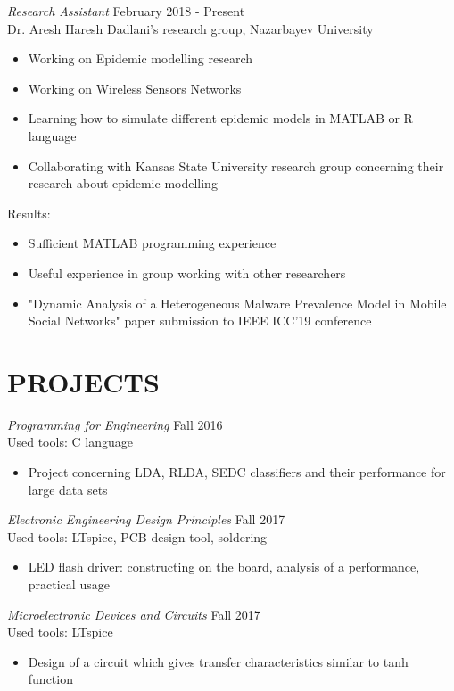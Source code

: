\documentclass[margin, 10pt]{res} %
\begin{document}
\begin{resume}
{\sl Research Assistant} \hfill February 2018 - Present \\
Dr. Aresh Haresh Dadlani's research group, Nazarbayev University
\begin{itemize}
\item Working on Epidemic modelling research
\item Working on Wireless Sensors Networks
\item Learning how to simulate different epidemic models in MATLAB or R language
\item Collaborating with Kansas State University research group concerning their research about epidemic modelling
\end{itemize} 
Results: 
\begin{itemize}
\item Sufficient MATLAB programming experience
\item Useful experience in group working with other researchers
\item "Dynamic Analysis of a Heterogeneous Malware Prevalence Model in Mobile Social Networks" paper submission to IEEE ICC'19 conference
\end{itemize} 
 
 
\section{PROJECTS}
 
{\sl Programming for Engineering} \hfill Fall 2016 \\
Used tools: C language
\begin{itemize}
\item Project concerning LDA, RLDA, SEDC classifiers and their performance for large data sets
\end{itemize} 

{\sl Electronic Engineering Design Principles} \hfill Fall 2017 \\
Used tools: LTspice, PCB design tool, soldering
\begin{itemize}
\item LED flash driver: constructing on the board, analysis of a performance, practical usage
\end{itemize} 

{\sl Microelectronic Devices and Circuits} \hfill Fall 2017 \\
Used tools: LTspice
\begin{itemize}
\item Design of a circuit which gives transfer characteristics similar to tanh function 
\end{itemize} 


\end{resume}
\end{document}
